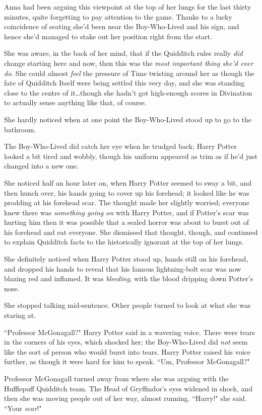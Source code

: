 Anna had been arguing this viewpoint at the top of her lungs for the last thirty minutes, quite forgetting to pay attention to the game. Thanks to a lucky coincidence of seating she'd been near the Boy-Who-Lived and his sign, and hence she'd managed to stake out her position right from the start.

She was aware, in the back of her mind, that if the Quidditch rules really \emph{did} change starting here and now, then this was the \emph{most important thing she'd ever do}. She could almost \emph{feel} the pressure of Time twisting around her as though the fate of Quidditch Itself were being settled this very day, and she was standing close to the centre of it…though she hadn't got high-enough scores in Divination to actually sense anything like that, of course.

She hardly noticed when at one point the Boy-Who-Lived stood up to go to the bathroom.

The Boy-Who-Lived did catch her eye when he trudged back; Harry Potter looked a bit tired and wobbly, though his uniform appeared as trim as if he'd just changed into a new one.

She noticed half an hour later on, when Harry Potter seemed to sway a bit, and then hunch over, his hands going to cover up his forehead; it looked like he was prodding at his forehead scar. The thought made her slightly worried; everyone knew there was \emph{something going on} with Harry Potter, and if Potter's scar was hurting him then it was possible that a sealed horror was about to burst out of his forehead and eat everyone. She dismissed that thought, though, and continued to explain Quidditch facts to the historically ignorant at the top of her lungs.

She definitely noticed when Harry Potter stood up, hands still on his forehead, and dropped his hands to reveal that his famous lightning-bolt scar was now blazing red and inflamed. It was \emph{bleeding}, with the blood dripping down Potter's nose.

She stopped talking mid-sentence. Other people turned to look at what she was staring at.

``Professor McGonagall?" Harry Potter said in a wavering voice. There were tears in the corners of his eyes, which shocked her; the Boy-Who-Lived did \emph{not} seem like the sort of person who would burst into tears. Harry Potter raised his voice further, as though it were hard for him to speak. ``Um, Professor McGonagall?"

Professor McGonagall turned away from where she was arguing with the Hufflepuff Quidditch team. The Head of Gryffindor's eyes widened in shock, and then she was moving people out of her way, almost running. ``Harry!" she said. ``Your \emph{scar}!"

